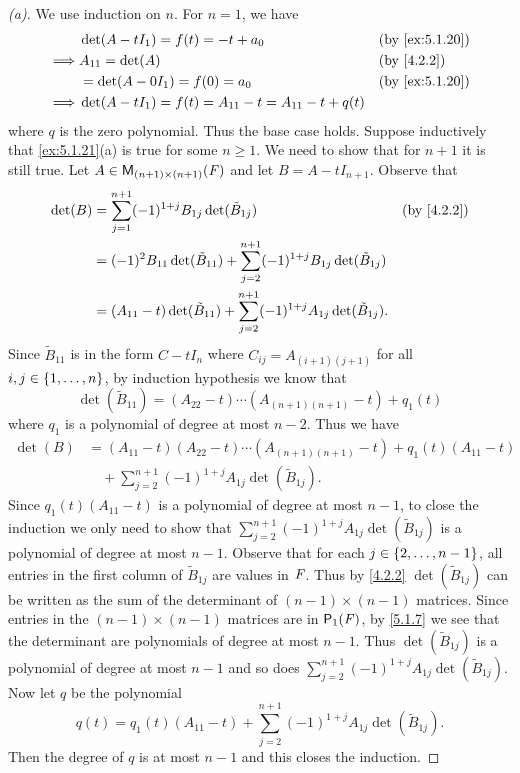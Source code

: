 \begin{proof}[(a)]
	We use induction on \(n\).
	For \(n = 1\), we have
	\begin{align*}
		         & \det(A - t I_1) = f(t) = -t + a_0                         &  & \by{ex:5.1.20} \\
		\implies & A_{1 1} = \det(A)                                         &  & \by{4.2.2}     \\
		         & = \det(A - 0 I_1) = f(0) = a_0                            &  & \by{ex:5.1.20} \\
		\implies & \det(A - t I_1) = f(t) = A_{1 1} - t = A_{1 1} - t + q(t)
	\end{align*}
	where \(q\) is the zero polynomial.
	Thus the base case holds.
	Suppose inductively that \cref{ex:5.1.21}(a) is true for some \(n \geq 1\).
	We need to show that for \(n + 1\) it is still true.
	Let \(A \in \ms[(n + 1)][(n + 1)][\F]\) and let \(B = A - t I_{n + 1}\).
	Observe that
	\begin{align*}
		\det(B) & = \sum_{j = 1}^{n + 1} (-1)^{1 + j} B_{1 j} \det(\tilde{B}_{1 j})                                          &  & \by{4.2.2} \\
		        & = (-1)^{2} B_{1 1} \det(\tilde{B}_{1 1}) + \sum_{j = 2}^{n + 1} (-1)^{1 + j} B_{1 j} \det(\tilde{B}_{1 j})                 \\
		        & = (A_{1 1} - t) \det(\tilde{B}_{1 1}) + \sum_{j = 2}^{n + 1} (-1)^{1 + j} A_{1 j} \det(\tilde{B}_{1 j}).
	\end{align*}
	Since \(\tilde{B}_{1 1}\) is in the form \(C - t I_n\) where \(C_{i j} = A_{(i + 1) (j + 1)}\) for all \(i, j \in \left\lbrace1, \dots, n\right\rbrace\), by induction hypothesis we know that
	\[
		\det(\tilde{B}_{1 1}) = (A_{2 2} - t) \cdots (A_{(n + 1) (n + 1)} - t) + q_1(t)
	\]
	where \(q_1\) is a polynomial of degree at most \(n - 2\).
	Thus we have
	\begin{align*}
		\det(B) & = (A_{1 1} - t) (A_{2 2} - t) \cdots (A_{(n + 1) (n + 1)} - t) + q_1(t) (A_{1 1} - t) \\
		        & \quad + \sum_{j = 2}^{n + 1} (-1)^{1 + j} A_{1 j} \det(\tilde{B}_{1 j}).
	\end{align*}
	Since \(q_1(t) (A_{1 1} - t)\) is a polynomial of degree at most \(n - 1\),  to close the induction we only need to show that \(\sum_{j = 2}^{n + 1} (-1)^{1 + j} A_{1 j} \det(\tilde{B}_{1 j})\) is a polynomial of degree at most \(n - 1\).
	Observe that for each \(j \in \left\lbrace2, \dots, n - 1\right\rbrace\), all entries in the first column of \(\tilde{B}_{1 j}\) are values in \(\mathit{F}\).
	Thus by \cref{4.2.2} \(\det(\tilde{B}_{1 j})\) can be written as the sum of the determinant of \((n - 1) \times (n - 1)\) matrices.
	Since entries in the \((n - 1) \times (n - 1)\) matrices are in \(\ps[1]{\F}\), by \cref{5.1.7} we see that the determinant are polynomials of degree at most \(n - 1\).
	Thus \(\det(\tilde{B}_{1 j})\) is a polynomial of degree at most \(n - 1\) and so does \(\sum_{j = 2}^{n + 1} (-1)^{1 + j} A_{1 j} \det(\tilde{B}_{1 j})\).
	Now let \(q\) be the polynomial
	\[
		q(t) = q_1(t) (A_{1 1} - t) + \sum_{j = 2}^{n + 1} (-1)^{1 + j} A_{1 j} \det(\tilde{B}_{1 j}).
	\]
	Then the degree of \(q\) is at most \(n - 1\) and this closes the induction.
\end{proof}

